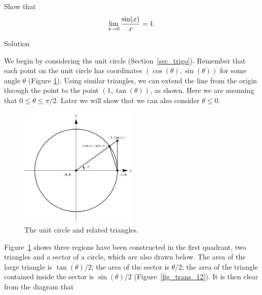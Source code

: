 \begin{example}\label{ex_limit_sinx_prove}
Show that $$\displaystyle \lim_{x\to 0} \frac{\sin (x)}{x} = 1.$$

Solution 



We begin by considering the unit circle (Section~\ref{sec_trigo}). Remember that each point on the unit circle has coordinates $(\cos (\theta),\sin (\theta))$ for some angle $\theta$ (Figure \ref{fig_lim_9}). Using similar triangles, we can extend the line from the origin through the point to the point $(1,\tan (\theta))$, as shown. Here we are assuming that $0\leq \theta \leq \pi/2$. Later we will show that we can also consider $\theta \leq 0$. 


\begin{figure}[H]
	\begin{center}
			\includegraphics[width=0.5\textwidth]{fig_lim_9}
	\caption{The unit circle and related triangles. }
	\label{fig_lim_9}
	\end{center}
\end{figure}



Figure~\ref{fig_lim_9} shows three regions have been constructed in the first quadrant, two triangles and a sector of a circle, which are also drawn below. The area of the large triangle is $\tan(\theta)/2$; the area of the sector is $\theta/2$; the area of the triangle contained inside the sector is $\sin(\theta)/2$ (Figure~\ref{fig_trans_12}). It is then clear from the diagram that 


\end{example}
